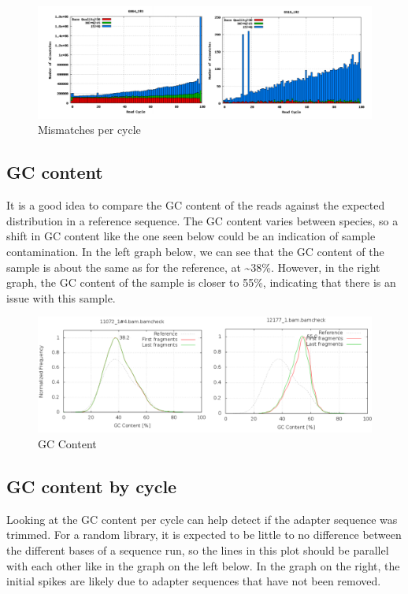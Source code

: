\documentclass[11pt]{article}
\begin{document}
    \begin{figure}
\centering
\includegraphics{img/mismatch_per_cycle_comparison.png}
\caption{Mismatches per cycle}
\end{figure}

    \hypertarget{gc-content}{%
\subsection{GC content}\label{gc-content}}

It is a good idea to compare the GC content of the reads against the
expected distribution in a reference sequence. The GC content varies
between species, so a shift in GC content like the one seen below could
be an indication of sample contamination. In the left graph below, we
can see that the GC content of the sample is about the same as for the
reference, at \textasciitilde38\%. However, in the right graph, the GC
content of the sample is closer to 55\%, indicating that there is an
issue with this sample.

    \begin{figure}
\centering
\includegraphics{img/gc_bias.png}
\caption{GC Content}
\end{figure}

    \hypertarget{gc-content-by-cycle}{%
\subsection{GC content by cycle}\label{gc-content-by-cycle}}

Looking at the GC content per cycle can help detect if the adapter
sequence was trimmed. For a random library, it is expected to be little
to no difference between the different bases of a sequence run, so the
lines in this plot should be parallel with each other like in the graph
on the left below. In the graph on the right, the initial spikes are
likely due to adapter sequences that have not been removed.
\end{document}
